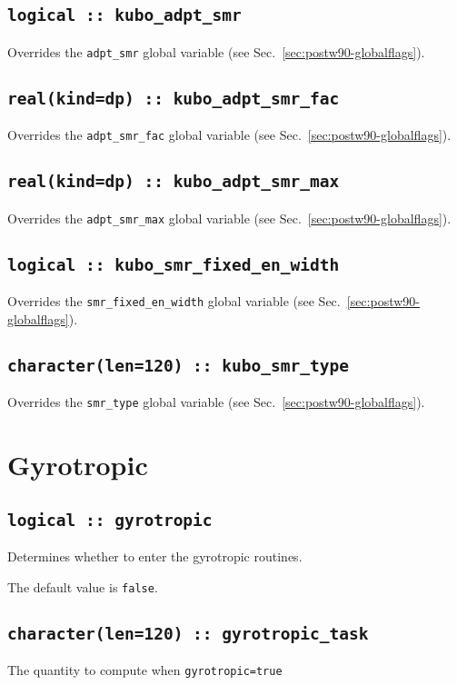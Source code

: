 \subsection[optics\_adpt\_smr]{\tt logical :: kubo\_adpt\_smr}
Overrides the \verb#adpt_smr# global variable (see
Sec.~\ref{sec:postw90-globalflags}).

\subsection[optics\_adpt\_smr\_fac]{\tt real(kind=dp) ::
  kubo\_adpt\_smr\_fac}
Overrides the \verb#adpt_smr_fac# global variable (see
Sec.~\ref{sec:postw90-globalflags}).

\subsection[optics\_adpt\_smr\_max]{\tt real(kind=dp) ::
  kubo\_adpt\_smr\_max}
Overrides the \verb#adpt_smr_max# global variable (see
Sec.~\ref{sec:postw90-globalflags}).

\subsection[optics\_smr\_fixed\_en\_width]{\tt logical :: 
kubo\_smr\_fixed\_en\_width}
Overrides the \verb#smr_fixed_en_width# global variable (see
Sec.~\ref{sec:postw90-globalflags}).

\subsection[optics\_smr\_type]{\tt  character(len=120) :: 
kubo\_smr\_type}
Overrides the \verb#smr_type# global variable (see
Sec.~\ref{sec:postw90-globalflags}).


\clearpage
\section{Gyrotropic}

\subsection[gyrotropic]{\tt logical :: gyrotropic}
Determines whether to enter the gyrotropic routines.

The default value is \verb#false#.


\subsection[gyrotropic\_task]{\tt character(len=120) ::  gyrotropic\_task}
The quantity to compute when {\tt gyrotropic=true}

